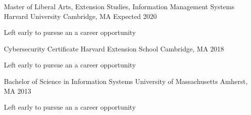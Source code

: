 
\begin{cventries}
  \cventry
    {Master of Liberal Arts, Extension Studies, Information Management Systems} %
    {Harvard University} %
    {Cambridge, MA} %
    {Expected 2020} %
    {
      \begin{cvitems} %
      \item {Left early to pursue an a career opportunity}
      \end{cvitems}
    }

  \cventry
    {Cybersecurity Certificate} %
    {Harvard Extension School} %
    {Cambridge, MA} %
    {2018} %
    {
      \begin{cvitems} %
      \item {Left early to pursue an a career opportunity}
      \end{cvitems}
    }

  \cventry
    {Bachelor of Science in Information Systems} %
    {University of Massachusetts} %
    {Amherst, MA} %
    {2013} %
    {
      \begin{cvitems} %
      \item {Left early to pursue an a career opportunity}
      \end{cvitems}
    }
  
\end{cventries}
